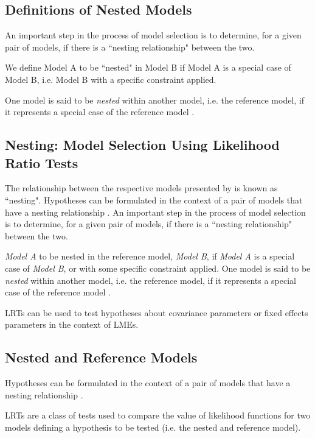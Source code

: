 \documentclass[MAIN.tex]{subfiles}
\begin{document}
\subsection{Definitions of Nested Models}
An important step in the process of model selection is to determine, for a given pair of models, if there is a ``nesting relationship" between the two.

We define Model A to be ``nested" in Model B if Model A is a special case of Model B, i.e. Model B with a specific constraint applied.

One model is said to be \emph{nested} within another model, i.e. the reference model, if it represents a special case of the reference model \citep{PB}.
\subsection{Nesting: Model Selection Using Likelihood Ratio Tests}
The relationship between the respective models presented by \citet{ARoy2009} is known as ``nesting".
Hypotheses can be formulated in the context of a pair of models that have a nesting relationship \citet{west}.
An important step in the process of model selection is to determine, for a given pair of models, if there is a ``nesting relationship" between the two.

\textit{Model A} to be nested in the reference model, \textit{Model B}, if \textit{Model A} is a special case of \textit{Model B}, or with some specific constraint applied. One model is said to be \emph{nested} within another model, i.e. the reference model, if it represents a special case of the reference model \citep{PB}.

LRTs can be used to test hypotheses about covariance parameters or fixed effects parameters in the context of LMEs.










\subsection{Nested and Reference Models}
Hypotheses can be formulated in the context of a pair of models that have a nesting relationship \citep{west}.

LRTs are a class of tests used to compare the value of likelihood functions for two models defining a hypothesis to be tested (i.e. the nested and reference model).
\end{document}
